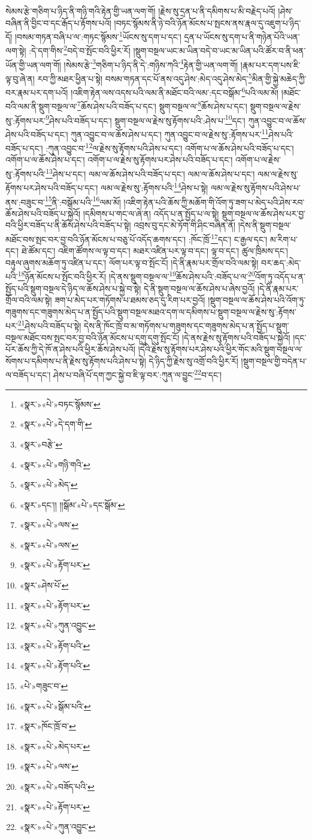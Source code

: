སེམས་རྩེ་གཅིག་པ་ཉིད་ནི་གཉི་གའི་རྟེན་གྱི་ཡན་ལག་གོ། །རྗེས་སུ་དྲན་པ་ནི་དམིགས་པ་མི་བརྗེད་པའོ། །ཤེས་བཞིན་ནི་བྱིང་བ་དང་རྒོད་པ་རྟོགས་པའོ། །བཏང་སྙོམས་ནི་ཉེ་བའི་ཉོན་མོངས་པ་སྤངས་ནས་རྣལ་དུ་འཇུག་པ་ཉིད་དོ། །བསམ་གཏན་བཞི་པ་ལ་:གཏང་སྙོམས་\footnote{«སྣར་»«པེ་»བཏང་སྙོམས་}ཡོངས་སུ་དག་པ་དང་། དྲན་པ་ཡོངས་སུ་དག་པ་ནི་གཉེན་པོའི་ཡན་ལག་སྟེ། :དེ་དག་གིས་\footnote{«སྣར་»«པེ་»དེ་དག་གི་}བདེ་བ་སྤོང་བའི་ཕྱིར་རོ། །སྡུག་བསྔལ་ཡང་མ་ཡིན་བདེ་བ་ཡང་མ་ཡིན་པའི་ཚོར་བ་ནི་ཕན་ཡོན་གྱི་ཡན་ལག་གོ། །སེམས་རྩེ་\footnote{«སྣར་»བརྩེ་}གཅིག་པ་ཉིད་ནི་དེ་:གཉིས་ཀའི་\footnote{«སྣར་»«པེ་»གཉི་གའི་}རྟེན་གྱི་ཡན་ལག་གོ། །རྣམ་པར་དག་པས་ཇི་ལྟ་བུ་ཞེ་ན། རབ་ཀྱི་མཐར་ཕྱིན་པ་སྟེ། བསམ་གཏན་དང་པོ་ནས་འདུ་ཤེས་:མེད་འདུ་ཤེས་མེད་\footnote{«སྣར་»«པེ་»མེད་}མིན་གྱི་སྐྱེ་མཆེད་ཀྱི་བར་རྣམ་པར་དག་པའོ། །འཇིག་རྟེན་ལས་འདས་པའི་ལམ་ནི་མཐོང་བའི་ལམ་:དང་བསྒོམ་\footnote{«སྣར་»དང་།། །།སྒོམ་«པེ་»དང་སྒོམ་}པའི་ལམ་མོ། །མཐོང་བའི་ལམ་ནི་སྡུག་བསྔལ་ལ་\footnote{«སྣར་»«པེ་»ལས་}ཆོས་ཤེས་པའི་བཟོད་པ་དང་། སྡུག་བསྔལ་ལ་\footnote{«སྣར་»«པེ་»ལས་}ཆོས་ཤེས་པ་དང་། སྡུག་བསྔལ་ལ་རྗེས་སུ་:རྟོགས་པར་\footnote{«སྣར་»«པེ་»རྟོག་པར་}ཤེས་པའི་བཟོད་པ་དང་། སྡུག་བསྔལ་ལ་རྗེས་སུ་རྟོགས་པའི་:ཤེས་པ་\footnote{«སྣར་»ཤེས་པོ་}དང་། ཀུན་འབྱུང་བ་ལ་ཆོས་ཤེས་པའི་བཟོད་པ་དང་། ཀུན་འབྱུང་བ་ལ་ཆོས་ཤེས་པ་དང་། ཀུན་འབྱུང་བ་ལ་རྗེས་སུ་:རྟོགས་པར་\footnote{«སྣར་»«པེ་»རྟོག་པར་}ཤེས་པའི་བཟོད་པ་དང་། :ཀུན་འབྱུང་བ་\footnote{«སྣར་»«པེ་»ཀུན་འབྱུང་}ལ་རྗེས་སུ་རྟོགས་པའི་ཤེས་པ་དང་། འགོག་པ་ལ་ཆོས་ཤེས་པའི་བཟོད་པ་དང་། འགོག་པ་ལ་ཆོས་ཤེས་པ་དང་། འགོག་པ་ལ་རྗེས་སུ་རྟོགས་པར་ཤེས་པའི་བཟོད་པ་དང་། འགོག་པ་ལ་རྗེས་སུ་:རྟོགས་པའི་\footnote{«སྣར་»«པེ་»རྟོག་པའི་}ཤེས་པ་དང་། ལམ་ལ་ཆོས་ཤེས་པའི་བཟོད་པ་དང་། ལམ་ལ་ཆོས་ཤེས་པ་དང་། ལམ་ལ་རྗེས་སུ་རྟོགས་པར་ཤེས་པའི་བཟོད་པ་དང་། ལམ་ལ་རྗེས་སུ་:རྟོགས་པའི་\footnote{«སྣར་»«པེ་»རྟོག་པའི་}ཤེས་པ་སྟེ། ལམ་ལ་རྗེས་སུ་རྟོགས་པའི་ཤེས་པ་ནས་:བཟུང་བ་\footnote{«པེ་»གཟུང་བ་}ནི་:བསྒོམ་པའི་\footnote{«སྣར་»«པེ་»སྒོམ་པའི་}ལམ་མོ། །འཇིག་རྟེན་པའི་ཆོས་ཀྱི་མཆོག་གི་འོག་ཏུ་ཟག་པ་མེད་པའི་ཤེས་རབ་ཆོས་ཤེས་པའི་བཟོད་པ་སྐྱེའོ། །དམིགས་པ་གང་ལ་ཞེ་ན། འདོད་པ་ན་སྤྱོད་པ་ལ་སྟེ། སྡུག་བསྔལ་ལ་ཆོས་ཤེས་པར་བྱ་བའི་ཕྱིར་བཟོད་པ་ནི་ཆོས་ཤེས་པའི་བཟོད་པ་སྟེ། འབྲས་བུ་དང་མེ་ཏོག་གི་ཤིང་བཞིན་ནོ། །དེས་ནི་སྡུག་བསྔལ་མཐོང་བས་སྤང་བར་བྱ་བའི་ཉོན་མོངས་པ་བཅུ་པོ་འདོད་ཆགས་དང་། :ཁོང་ཁྲོ་\footnote{«སྣར་»ཁོང་ཁྲོ་བ་}དང་། ང་རྒྱལ་དང་། མ་རིག་པ་དང་། ཐེ་ཚོམ་དང་། འཇིག་ཚོགས་ལ་ལྟ་བ་དང་། མཐར་འཛིན་པར་ལྟ་བ་དང་། ལྟ་བ་དང་། ཚུལ་ཁྲིམས་དང་། བརྟུལ་ཞུགས་མཆོག་ཏུ་འཛིན་པ་དང་། ལོག་པར་ལྟ་བ་སྤོང་ངོ། །དེ་ནི་རྣམ་པར་གྲོལ་བའི་ལམ་སྟེ། བར་ཆད་:མེད་པའི་\footnote{«སྣར་»«པེ་»མེད་པར་}ཉོན་མོངས་པ་སྤོང་བའི་ཕྱིར་རོ། །དེ་ནས་སྡུག་བསྔལ་ལ་\footnote{«སྣར་»«པེ་»ལས་}ཆོས་ཤེས་པའི་:བཟོད་པ་ལ་\footnote{«སྣར་»«པེ་»བཟོད་པའི་}འོག་ཏུ་འདོད་པ་ན་སྤྱོད་པའི་སྡུག་བསྔལ་དེ་ཉིད་ལ་ཆོས་ཤེས་པ་སྐྱེ་བ་སྟེ། དེ་ནི་སྡུག་བསྔལ་ལ་ཆོས་ཤེས་པ་ཞེས་བྱའོ། །དེ་ནི་རྣམ་པར་གྲོལ་བའི་ལམ་སྟེ། ཟག་པ་མེད་པར་གཏོགས་པ་ཐམས་ཅད་དུ་རིག་པར་བྱའོ། །སྡུག་བསྔལ་ལ་ཆོས་ཤེས་པའི་འོག་ཏུ་གཟུགས་དང་གཟུགས་མེད་པ་ན་སྤྱོད་པའི་སྡུག་བསྔལ་མཐའ་དག་ལ་དམིགས་པ་སྡུག་བསྔལ་ལ་རྗེས་སུ་:རྟོགས་པར་\footnote{«སྣར་»«པེ་»རྟོག་པར་}ཤེས་པའི་བཟོད་པ་སྟེ། དེས་ནི་ཁོང་ཁྲོ་བ་མ་གཏོགས་པ་གཟུགས་དང་གཟུགས་མེད་པ་ན་སྤྱོད་པ་སྡུག་བསྔལ་མཐོང་བས་སྤང་བར་བྱ་བའི་ཉོན་མོངས་པ་དགུ་དགུ་སྤོང་ངོ། །དེ་ནས་རྗེས་སུ་རྟོགས་པའི་བཟོད་པ་སྐྱེའོ། །དང་པོར་ཆོས་ཀྱི་དེ་ཁོ་ན་ཤེས་པའི་ཕྱིར་ཆོས་ཤེས་པའོ། །དེའི་རྗེས་སུ་རྟོགས་པར་ཤེས་པའི་ཕྱིར་གོང་མའི་སྡུག་བསྔལ་ལ་སོགས་པ་དམིགས་པ་ནི་རྗེས་སུ་རྟོགས་པའི་ཤེས་པ་སྟེ། དེ་ཉིད་ཀྱི་རྗེས་སུ་འགྲོ་བའི་ཕྱིར་རོ། །སྡུག་བསྔལ་གྱི་བདེན་པ་ལ་བཟོད་པ་དང་། ཤེས་པ་བཞི་པོ་དག་ཀྱང་སྐྱེ་བ་ཇི་ལྟ་བར་:ཀུན་ལ་བྱུང་\footnote{«སྣར་»«པེ་»ཀུན་འབྱུང་}བ་དང་། 
